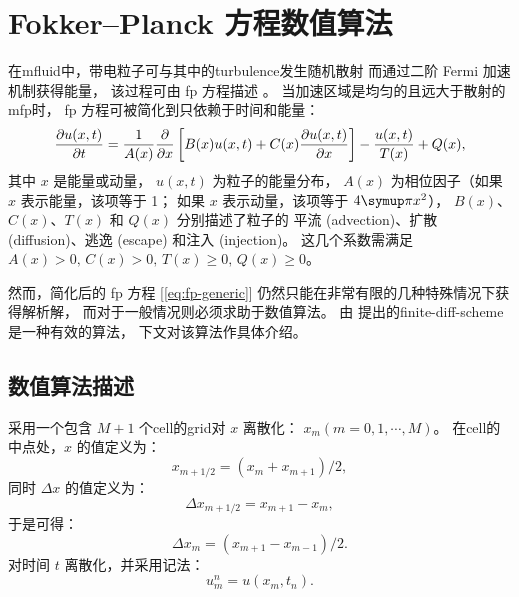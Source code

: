 
\chapter{Fokker--Planck 方程数值算法}
\label{app:fpsolver}

在\ac{mfluid}中，带电粒子可与其中的\ac{turbulence}发生随机散射
而通过二阶 Fermi 加速机制获得能量\cite{fermi1949,fermi1954,davis1956}，
该过程可由 \acf{fp} 方程描述
\cite{schlickeiser1989,eilek1991,schlickeiser2002}。
当加速区域是均匀的且远大于散射的\ac{mfp}时，
\ac{fp} 方程可被简化到只依赖于时间和能量\cite{park1995,park1996}：
\begin{equation}
  \label{eq:fp-generic}
  \frac{\partial u(x,t)}{\partial t} = \frac{1}{A(x)} \frac{\partial }{\partial x}
    \left[ B(x) u(x,t) + C(x) \frac{\partial u(x,t)}{\partial x} \right]
    - \frac{u(x,t)}{T(x)} + Q(x) ,
\end{equation}
其中
$x$ 是能量或动量，
$u(x,t)$ 为粒子的能量分布，
$A(x)$ 为相位因子（如果 $x$ 表示能量，该项等于 1；
如果 $x$ 表示动量，该项等于 $4\Cpi x^2$），
$B(x)$、$C(x)$、$T(x)$ 和 $Q(x)$ 分别描述了粒子的
平流 (advection)、扩散 (diffusion)、逃逸 (escape) 和注入 (injection)。
这几个系数需满足 $A(x) > 0,\, C(x) > 0,\, T(x) \ge 0,\, Q(x) \ge 0$。

然而，简化后的 \ac{fp} 方程 [\autoref{eq:fp-generic}]
仍然只能在非常有限的几种特殊情况下获得解析解，
而对于一般情况则必须求助于数值算法。
由  提出的\ac{finite-diff-scheme}是一种有效的算法，
下文对该算法作具体介绍。


\section{数值算法描述}

采用一个包含 $M+1$ 个\ac{cell}的\ac{grid}对 $x$ 离散化：
$x_m (m = 0, 1, \cdots, M)$。
在\ac{cell}的中点处，$x$ 的值定义为：
\begin{equation}
  \label{eq:x-mid}
  x_{m+1/2} = (x_m + x_{m+1}) \big/ 2 ,
\end{equation}
同时 $\Delta x$ 的值定义为：
\begin{equation}
  \label{eq:dx-mid}
  \Delta x_{m+1/2} = x_{m+1} - x_m ,
\end{equation}
于是可得：
\begin{equation}
  \label{eq:dx}
  \Delta x_m = (x_{m+1} - x_{m-1}) \big/ 2 .
\end{equation}
对时间 $t$ 离散化，并采用记法：
\begin{equation}
  \label{eq:u-t}
  u_m^n = u(x_m, t_n) .
\end{equation}

